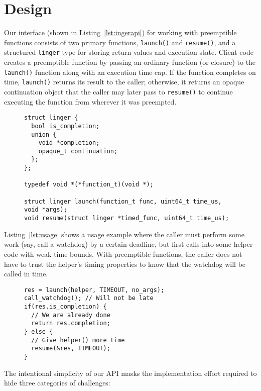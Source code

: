 \section{Design}

Our interface (shown in Listing~\ref{lst:ingerapi}) for working with
preemptible functions consists of two primary functions, \texttt{launch()} and
\texttt{resume()}, and a structured \texttt{linger} type for storing return values
and execution state.  Client code creates a preemptible function by passing an
ordinary function (or closure) to the \texttt{launch()} function along with an
execution time cap.  If the function completes on time,
\texttt{launch()} returns its result to the caller; otherwise, it returns an opaque
continuation object that the caller may later pass to \texttt{resume()} to continue
executing the function from wherever it was preempted.

\begin{figure}
\begin{lstlisting}[label=lst:ingerapi,caption=Preemptible functions C-language interface]
struct linger {
  bool is_completion;
  union {
    void *completion;
    opaque_t continuation;
  };
};

typedef void *(*function_t)(void *);

struct linger launch(function_t func, uint64_t time_us, void *args);
void resume(struct linger *timed_func, uint64_t time_us);
\end{lstlisting}
\end{figure}

Listing~\ref{lst:usage} shows a usage example where the caller must
perform some work (say, call a watchdog) by a certain deadline, but first
calls into some helper code with weak time bounds.  With preemptible functions,
the caller does not have to trust the helper's timing properties to know that the
watchdog will be called
in time.

\begin{figure}
\begin{lstlisting}[label=lst:usage,caption=Preemptible function usage example]
res = launch(helper, TIMEOUT, no_args);
call_watchdog(); // Will not be late
if(res.is_completion) {
  // We are already done
  return res.completion;
} else {
  // Give helper() more time
  resume(&res, TIMEOUT);
}
\end{lstlisting}
\end{figure}

The intentional simplicity of our API masks the implementation effort required to
hide three categories of challenges:

